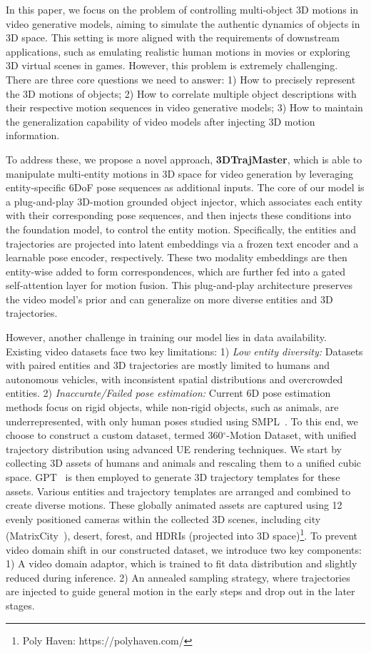In this paper, we focus on the problem of controlling multi-object 3D motions in video generative models, aiming to simulate the authentic dynamics of objects in 3D space.
This setting is more aligned with the requirements of downstream applications, such as emulating realistic human motions in movies or exploring 3D virtual scenes in games.
However, this problem is extremely challenging.
There are three core questions we need to answer:
1) How to precisely represent the 3D motions of objects; 
2) How to correlate multiple object descriptions with their respective motion sequences in video generative models;
3) How to maintain the generalization capability of video models after injecting 3D motion information.

To address these, we propose a novel approach, \textbf{3DTrajMaster}, which is able to manipulate multi-entity motions in 3D space for video generation by leveraging entity-specific 6DoF pose sequences as additional inputs.
The core of our model is a plug-and-play 3D-motion grounded object injector, which associates each entity with their corresponding pose sequences, and then injects these conditions into the foundation model, to control the entity motion. Specifically, the entities and trajectories are projected into latent embeddings via a frozen text encoder and a learnable pose encoder, respectively. 
These two modality embeddings are then entity-wise added to form correspondences, which are further fed into a gated self-attention layer for motion fusion. This plug-and-play architecture preserves the video model’s prior and can generalize on more diverse entities and 3D trajectories.


However, another challenge in training our model lies in data availability. Existing video datasets face two key limitations: 
1) \textit{Low entity diversity:} Datasets with paired entities and 3D trajectories are mostly limited to humans and autonomous vehicles, with inconsistent spatial distributions and overcrowded entities. 
2) \textit{Inaccurate/Failed pose estimation:} Current 6D pose estimation methods focus on rigid objects, while non-rigid objects, such as animals, are underrepresented, with only human poses studied using SMPL~\citep{loper2023smpl}. 
To this end, we choose to construct a custom dataset, termed 360$^{\circ}$-Motion Dataset, with unified trajectory distribution using advanced UE rendering techniques. 
We start by collecting 3D assets of humans and animals and rescaling them to a unified cubic space. 
GPT~\citep{achiam2023gpt} is then employed to generate 3D trajectory templates for these assets. 
Various entities and trajectory templates are arranged and combined to create diverse motions. These globally animated assets are captured using 12 evenly positioned cameras within the collected 3D scenes, including city (MatrixCity~\citep{li2023matrixcity}), desert, forest, and HDRIs (projected into 3D space)\footnote{Poly Haven: https://polyhaven.com/}. To prevent video domain shift in our constructed dataset, we introduce two key components: 
1) A video domain adaptor, which is trained to fit data distribution and slightly reduced during inference. 
2) An annealed sampling strategy, where trajectories are injected to guide general motion in the early steps and drop out in the later stages. 

